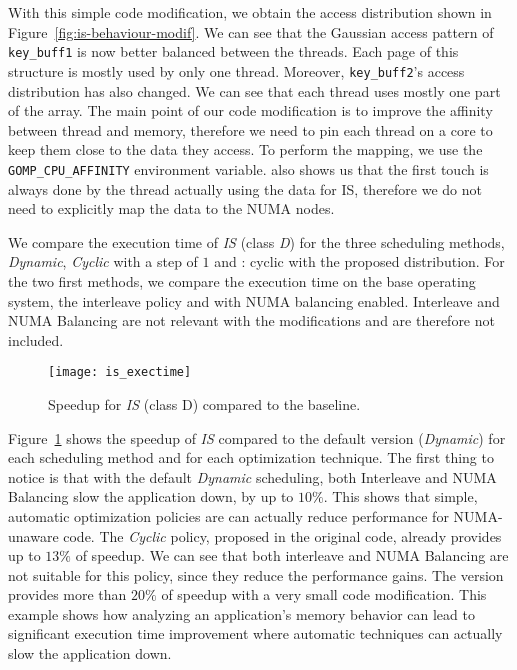 With this simple code modification, we obtain the access distribution
shown in Figure~\ref{fig:is-behaviour-modif}. We can see that the Gaussian
access pattern of \texttt{key\_buff1} is now better balanced between the threads. Each page
of this structure is mostly used by only one thread. Moreover,
\texttt{key\_buff2}'s access distribution has also changed. We can see that
each thread uses mostly one part of the array.
The main point of our code modification is to improve the affinity between
thread and memory, therefore we need to pin each thread on a core to keep them
close to the data they access. To perform the mapping, we use the \texttt{GOMP\_CPU\_AFFINITY} environment variable. \TABARNAC
also shows us that the first touch is always done by the thread actually using
the data for IS, therefore we do not need to explicitly map the data to the NUMA nodes.

We compare the execution time of \emph{IS} (class \emph{D}) for the three scheduling
methods, \emph{Dynamic}, \emph{Cyclic} with a step of $1$ and \TABARNAC:
cyclic with the proposed distribution. For the two first methods, we compare the
execution time on the base operating system, the interleave policy and with NUMA balancing enabled. Interleave and NUMA Balancing are not relevant with the
\TABARNAC modifications and are therefore not included.

\begin{figure}[!p]
    \centering
    \texttt{[image: is\_exectime]}
    \vspace{-5mm}
    \caption{Speedup for \emph{IS} (class D) compared to the baseline.}
\label{fig:is-res}
\end{figure}

Figure~\ref{fig:is-res} shows the speedup of \emph{IS} compared to
the default version (\emph{Dynamic}) for each scheduling method and for each
optimization technique. The first thing to notice is that with the default
\emph{Dynamic} scheduling, both Interleave and NUMA Balancing slow
the application down, by up to $10\%$. This shows that simple, automatic optimization policies are can actually reduce performance
for NUMA-unaware code.
The \emph{Cyclic} policy, proposed in the original code, already provides up to $13\%$ of
speedup. We can see that both interleave and NUMA Balancing are not suitable
for this policy, since they reduce the performance gains.
The \TABARNAC version provides more than $20\%$ of speedup with a very small code
modification.
This example shows how analyzing an application's memory behavior can lead to
significant execution time improvement where automatic techniques can actually slow
the application down.

